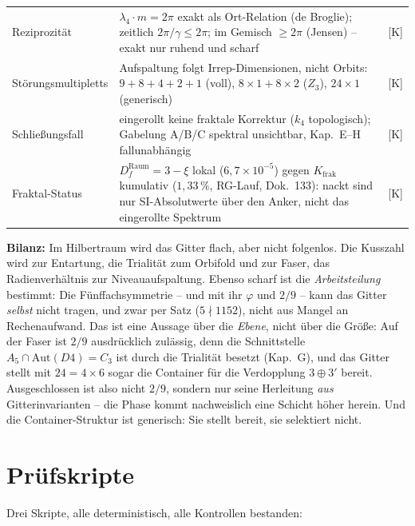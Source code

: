 \documentclass[11pt]{report}
\begin{document}
{\begin{longtable}{lp{6.4cm}l}
Reziprozität & $\lambda_4\cdot m = 2\pi$ exakt als Ort-Relation
  (de Broglie); zeitlich $2\pi/\gamma \le 2\pi$; im Gemisch
  $\ge 2\pi$ (Jensen) -- exakt nur ruhend und scharf & [K] \\
Störungsmultipletts & Aufspaltung folgt Irrep-Dimensionen, nicht
  Orbits: $9{+}8{+}4{+}2{+}1$ (voll), $8{\times}1{+}8{\times}2$
  ($Z_3$), $24{\times}1$ (generisch) & [K] \\
Schließungsfall & eingerollt keine fraktale Korrektur
  ($k_4$ topologisch); Gabelung A/B/C spektral unsichtbar,
  Kap.~E--H fallunabhängig & [K] \\
Fraktal-Status & $D_f^\text{Raum} = 3-\xi$ lokal ($6{,}7{\times}10^{-5}$)
  gegen $K_\text{frak}$ kumulativ ($1{,}33\,\%$, RG-Lauf, Dok.~133):
  nackt sind nur SI-Absolutwerte über den Anker, nicht das
  eingerollte Spektrum & [K] \\
\end{longtable}
}

\medskip
\noindent\textbf{Bilanz:} Im Hilbertraum wird das Gitter flach, aber
nicht folgenlos. Die Kusszahl wird zur Entartung, die Trialität zum
Orbifold und zur Faser, das Radienverhältnis zur Niveauaufspaltung.
Ebenso scharf ist die \emph{Arbeitsteilung} bestimmt: Die
Fünffachsymmetrie -- und mit ihr $\varphi$ und $2/9$ -- kann das
Gitter \emph{selbst} nicht tragen, und zwar per Satz
($5 \nmid 1152$), nicht aus Mangel an Rechenaufwand. Das ist eine
Aussage über die \emph{Ebene}, nicht über die Größe: Auf der
Faser ist $2/9$ ausdrücklich zulässig, denn die Schnittstelle
$A_5 \cap \text{Aut}(D4) = C_3$ ist durch die Trialität besetzt
(Kap.~G), und das Gitter stellt mit $24 = 4\times6$ sogar die
Container für die Verdopplung $3\oplus3'$ bereit. Ausgeschlossen
ist also nicht $2/9$, sondern nur seine Herleitung \emph{aus}
Gitterinvarianten -- die Phase kommt nachweislich eine Schicht
höher herein. Und die Container-Struktur ist generisch: Sie stellt
bereit, sie selektiert nicht.

\chapter{Prüfskripte}

Drei Skripte, alle deterministisch, alle Kontrollen bestanden:
\end{document}
